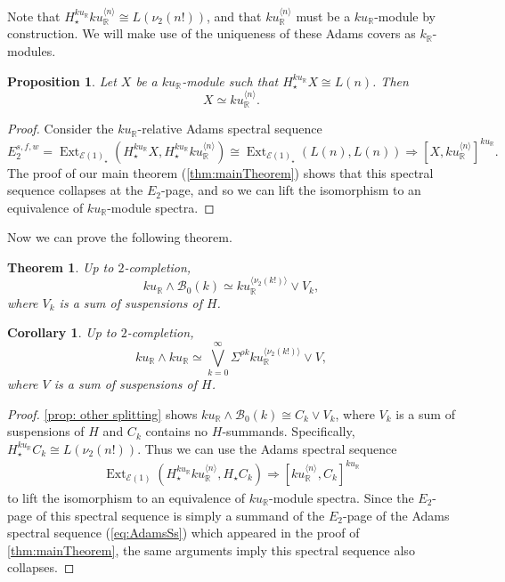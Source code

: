 \documentclass{amsart}
\newtheorem{theorem}[equation]{Theorem}
\newtheorem{proposition}[equation]{Proposition}
\newtheorem{cor}[equation]{Corollary}
\theoremstyle{plain}
\numberwithin{equation}{section}
\numberwithin{figure}{section}
\DeclareMathOperator{\Ext}{Ext}
\newcommand{\mR}{{\mathbb R}}
\newcommand{\cB}{{\mathcal B}}
\newcommand{\cE}{{\mathcal E}}
\newcommand{\0}{\langle 0 \rangle }
\begin{document}
Note that $H_{\star}^{ku_{\mR}}ku_{\mR}^{\langle n \rangle} \cong L(\nu_{2}(n!))$, and that $ku_{\mR}^{\langle n \rangle}$ must be a $ku_{\mR}$-module by construction. We will make use of the uniqueness of these Adams covers as $k_{\mR}$-modules.
\begin{proposition}\label{prop:uniqueness of adams covers}
    Let $X$ be a $ku_{\mR}$-module such that $H_{\star}^{ku_{\mR}}X \cong L(n)$. Then 
    \[ X \simeq ku_{\mR}^{\langle n \rangle}.\]
\end{proposition}
\begin{proof}
    Consider the $ku_{\mR}$-relative Adams spectral sequence
\[E_2^{s,f,w} = \Ext_{\cE(1)_{\star}}(H_{\star}^{ku_{\mR}}X, H_{\star}^{ku_{\mR}}ku_{\mR}^{\langle n \rangle}) \cong \Ext_{\cE(1)_{\star}}\left(L(n), L(n)\right)\Longrightarrow [X, ku_{\mR}^{\langle n \rangle} ]^{ku_{\mR}}.\]
The proof of our main theorem (\cref{thm:mainTheorem}) shows that this spectral sequence collapses at the $E_{2}$-page, and so we can lift the isomorphism to an equivalence of $ku_{\mR}$-module spectra.
\end{proof}

 

Now we can prove the following theorem.

\begin{theorem}
    Up to $2$-completion,    \[ ku_{\mR} \wedge \cB_{0}(k) \simeq ku_{\mR}^{\langle \nu_{2}(k!) \rangle} \vee V_{k},\]
where $V_{k}$ is a sum of suspensions of $H$.
\end{theorem}

\begin{cor} \label{thm:C2AdamsCovers}
    Up to $2$-completion,    \[ ku_{\mR} \wedge ku_{\mR} \simeq \bigvee\limits_{k=0}^{\infty} \Sigma^{\rho k}ku_{\mR}^{\langle \nu_{2}(k!) \rangle} \vee V,\]
where $V$ is a sum of suspensions of $H$.
\end{cor}

\begin{proof}
\cref{prop: other splitting} shows $ku_{\mR} \wedge \cB_{0}(k) \cong C_{k} \vee V_{k}$, where $V_k$ is a sum of suspensions of $H$ and $C_k$ contains no $H$-summands. Specifically, $H_{\star}^{ku_{\mR}}C_{k} \cong L(\nu_{2}(n!))$. Thus we can use the Adams spectral sequence
\begin{align*} \label{eq:AdamsSpecSeqC2Covers}
    \Ext_{\cE(1)}(H_{\star}^{ku_{\mR}}ku_{\mR}^{\langle n \rangle}, H_{\star}C_{k}) \Longrightarrow [ku_{\mR}^{\langle n \rangle}, C_{k}]^{ku_{\mR}}
\end{align*}
to lift the isomorphism to an equivalence of $ku_{\mR}$-module spectra. Since the $E_2$-page of this spectral sequence is simply a summand of the $E_{2}$-page of the Adams spectral sequence (\ref{eq:AdamsSs}) which appeared in the proof of \cref{thm:mainTheorem}, the same arguments imply this spectral sequence also collapses.
\end{proof}
    
\end{document}
